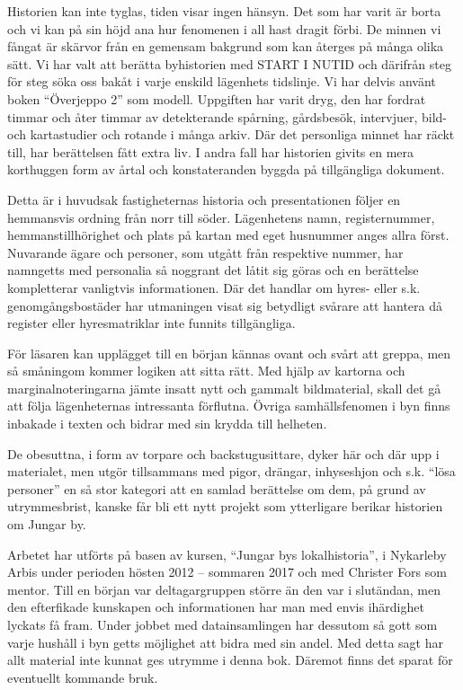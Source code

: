 

Historien kan inte tyglas, tiden visar ingen hänsyn. Det som har varit är borta och vi kan på sin höjd ana hur fenomenen i all hast dragit förbi. De minnen vi fångat är skärvor från en gemensam bakgrund som kan återges på många olika sätt. Vi har valt att berätta byhistorien med START I NUTID och därifrån steg för steg söka oss bakåt i varje enskild lägenhets tidslinje. Vi har delvis använt boken ``Överjeppo 2'' som modell. Uppgiften har varit dryg, den har fordrat timmar och åter timmar av detekterande spårning, gårdsbesök, intervjuer, bild- och kartastudier och rotande i många arkiv. Där det personliga minnet har räckt till, har berättelsen fått extra liv. I andra fall har historien givits en mera korthuggen form av årtal och konstateranden byggda på tillgängliga dokument.

Detta är i huvudsak fastigheternas historia och presentationen följer en hemmansvis ordning från norr till söder. Lägenhetens namn, registernummer, hemmanstillhörighet och plats på kartan med eget husnummer anges allra först. Nuvarande ägare och personer, som utgått från respektive nummer, har namngetts med personalia så noggrant det låtit sig göras och en berättelse kompletterar vanligtvis informationen. Där det handlar om hyres- eller s.k. genomgångsbostäder har utmaningen visat sig betydligt svårare att hantera då register eller hyresmatriklar inte funnits tillgängliga.

För läsaren kan upplägget till en början kännas ovant och svårt att greppa, men så småningom kommer logiken att sitta rätt. Med hjälp av kartorna och marginalnoteringarna jämte insatt nytt och gammalt bildmaterial, skall det gå att följa lägenheternas intressanta förflutna. Övriga samhällsfenomen i byn finns inbakade i texten och bidrar med sin krydda till helheten.

De obesuttna, i form av torpare och backstugusittare, dyker här och där upp i materialet, men utgör tillsammans med pigor, drängar, inhyseshjon och s.k. ``lösa personer'' en så stor kategori att en samlad berättelse om dem, på grund av utrymmesbrist, kanske får bli ett nytt projekt som ytterligare berikar historien om Jungar by.

Arbetet har utförts på basen av kursen, ``Jungar bys lokalhistoria'', i Nykarleby Arbis under perioden hösten 2012 -- sommaren 2017 och med Christer Fors som mentor. Till en början var deltagargruppen större än den var i slutändan, men den efterfikade kunskapen och informationen har man med envis ihärdighet lyckats få fram. Under jobbet med datainsamlingen har dessutom så gott som varje hushåll i byn getts möjlighet att bidra med sin andel. Med detta sagt har allt material inte kunnat ges utrymme i denna bok. Däremot finns det sparat för eventuellt kommande bruk.

